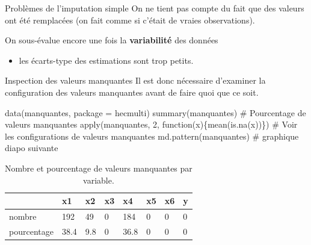 \documentclass[
  ignorenonframetext,
]{beamer}
\newenvironment{Shaded}{\begin{snugshade}}{\end{snugshade}}
\newcommand{\AttributeTok}[1]{\textcolor[rgb]{0.40,0.45,0.13}{#1}}
\newcommand{\CommentTok}[1]{\textcolor[rgb]{0.37,0.37,0.37}{#1}}
\newcommand{\ControlFlowTok}[1]{\textcolor[rgb]{0.00,0.23,0.31}{#1}}
\newcommand{\DecValTok}[1]{\textcolor[rgb]{0.68,0.00,0.00}{#1}}
\newcommand{\FunctionTok}[1]{\textcolor[rgb]{0.28,0.35,0.67}{#1}}
\newcommand{\NormalTok}[1]{\textcolor[rgb]{0.00,0.23,0.31}{#1}}
\newcommand{\StringTok}[1]{\textcolor[rgb]{0.13,0.47,0.30}{#1}}
\providecommand{\tightlist}{%
  \setlength{\itemsep}{0pt}\setlength{\parskip}{0pt}}\usepackage{longtable,booktabs,array}
\begin{document}
\begin{frame}{Problèmes de l'imputation simple}
\protect\hypertarget{probluxe8mes-de-limputation-simple}{}
On ne tient pas compte du fait que des valeurs ont été remplacées (on
fait comme si c'était de vraies observations).

On sous-évalue encore une fois la \textbf{variabilité} des données

\begin{itemize}
\tightlist
\item
  les écarts-type des estimations sont trop petits.
\end{itemize}
\end{frame}

\begin{frame}[fragile]{Inspection des valeurs manquantes}
\protect\hypertarget{inspection-des-valeurs-manquantes}{}
Il est donc nécessaire d'examiner la configuration des valeurs
manquantes avant de faire quoi que ce soit.

\begin{Shaded}
\begin{Highlighting}[numbers=left,,]
\FunctionTok{data}\NormalTok{(manquantes, }\AttributeTok{package =} \StringTok{\textquotesingle{}hecmulti\textquotesingle{}}\NormalTok{)}
\FunctionTok{summary}\NormalTok{(manquantes)}
\CommentTok{\# Pourcentage de valeurs manquantes}
\FunctionTok{apply}\NormalTok{(manquantes, }\DecValTok{2}\NormalTok{, }\ControlFlowTok{function}\NormalTok{(x)\{}\FunctionTok{mean}\NormalTok{(}\FunctionTok{is.na}\NormalTok{(x))\})}
\CommentTok{\# Voir les configurations de valeurs manquantes}
\FunctionTok{md.pattern}\NormalTok{(manquantes) }\CommentTok{\# graphique diapo suivante}
\end{Highlighting}
\end{Shaded}

\hypertarget{tbl-manquantes-univ}{}
\begin{table}
\caption{\label{tbl-manquantes-univ}Nombre et pourcentage de valeurs manquantes par variable. }\tabularnewline

\centering
\begin{tabular}{llllllll}
\toprule
  & x1 & x2 & x3 & x4 & x5 & x6 & y\\
\midrule
nombre & 192 & 49 & 0 & 184 & 0 & 0 & 0\\
pourcentage & 38.4 & 9.8 & 0 & 36.8 & 0 & 0 & 0\\
\bottomrule
\end{tabular}
\end{table}
\end{frame}
\end{document}
